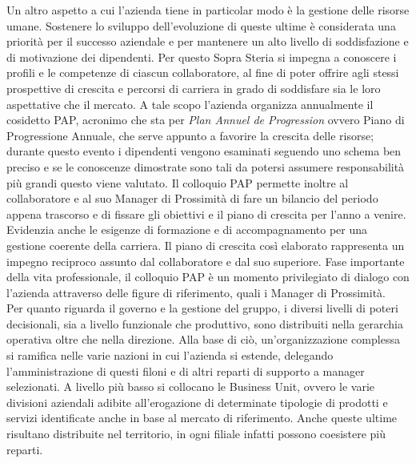 	Un altro aspetto a cui l'azienda tiene in particolar modo è la gestione delle risorse umane. Sostenere lo sviluppo dell'evoluzione di queste ultime è considerata una priorità per il successo aziendale e per mantenere un alto livello di soddisfazione e di motivazione dei dipendenti. Per questo Sopra Steria si impegna a conoscere i profili e le competenze di ciascun collaboratore, al fine di poter offrire agli stessi prospettive di crescita e percorsi di carriera in grado di soddisfare sia le loro aspettative che il mercato. A tale scopo l'azienda organizza annualmente il cosidetto PAP\glossario, acronimo che sta per \textit{Plan Annuel de Progression} ovvero Piano di Progressione Annuale, che serve appunto a favorire la crescita delle risorse; durante questo evento i dipendenti vengono esaminati seguendo uno schema ben preciso e se le conoscenze dimostrate sono tali da potersi assumere responsabilità più grandi questo viene valutato. Il colloquio PAP permette inoltre al collaboratore e al suo Manager di Prossimità di fare un bilancio del periodo appena trascorso e di fissare gli obiettivi e il piano di crescita per l'anno a venire. Evidenzia anche le esigenze di formazione e di accompagnamento per una gestione coerente della carriera. Il piano di crescita così elaborato rappresenta un impegno reciproco assunto dal collaboratore e dal suo superiore. Fase importante della vita professionale, il colloquio PAP è un momento privilegiato di dialogo con l'azienda attraverso delle figure di riferimento, quali i Manager di Prossimità.\\
	
	
	Per quanto riguarda il governo e la gestione del gruppo, i diversi livelli di poteri decisionali, sia a livello funzionale che produttivo, sono distribuiti nella gerarchia operativa oltre che nella direzione. Alla base di ciò, un'organizzazione complessa si ramifica nelle varie nazioni in cui l'azienda si estende, delegando l'amministrazione di questi filoni e di altri reparti di supporto a manager selezionati. A livello più basso si collocano le Business Unit, ovvero le varie divisioni aziendali adibite all'erogazione di determinate tipologie di prodotti e servizi identificate anche in base al mercato di riferimento. Anche queste ultime risultano distribuite nel territorio, in ogni filiale infatti possono coesistere più reparti.\\
	

